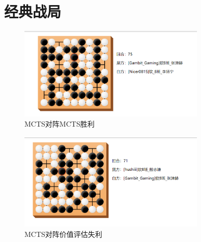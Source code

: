 \documentclass{ctexrep}
\begin{document}
\section{经典战局}
\begin{figure}[H] %
    \centering %
    \includegraphics[width=0.8\textwidth]{1.png} %
    \caption{MCTS对阵MCTS胜利} %
    \label{wolf} %
\end{figure}%



\begin{figure}[H] %
    \centering %
    \includegraphics[width=0.8\textwidth]{2.png} %
    \caption{MCTS对阵价值评估失利} %
    \label{wolf} %
\end{figure}%
\end{document}
